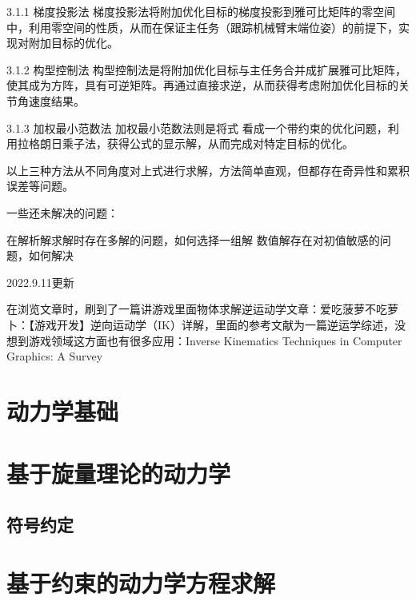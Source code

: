 3.1.1 梯度投影法
梯度投影法将附加优化目标的梯度投影到雅可比矩阵的零空间中，利用零空间的性质，从而在保证主任务（跟踪机械臂末端位姿）的前提下，实现对附加目标的优化。

3.1.2 构型控制法
构型控制法是将附加优化目标与主任务合并成扩展雅可比矩阵，使其成为方阵，具有可逆矩阵。再通过直接求逆，从而获得考虑附加优化目标的关节角速度结果。

3.1.3 加权最小范数法
加权最小范数法则是将式 
 看成一个带约束的优化问题，利用拉格朗日乘子法，获得公式的显示解，从而完成对特定目标的优化。

以上三种方法从不同角度对上式进行求解，方法简单直观，但都存在奇异性和累积误差等问题。





一些还未解决的问题：

在解析解求解时存在多解的问题，如何选择一组解
数值解存在对初值敏感的问题，如何解决


2022.9.11更新

在浏览文章时，刷到了一篇讲游戏里面物体求解逆运动学文章：爱吃菠萝不吃萝卜：【游戏开发】逆向运动学（IK）详解，里面的参考文献为一篇逆运学综述，没想到游戏领域这方面也有很多应用：Inverse Kinematics Techniques in Computer Graphics: A Survey
\chapter{动力学基础}
\chapter{基于旋量理论的动力学}
\section{符号约定}
\section{}
\chapter{基于约束的动力学方程求解}
